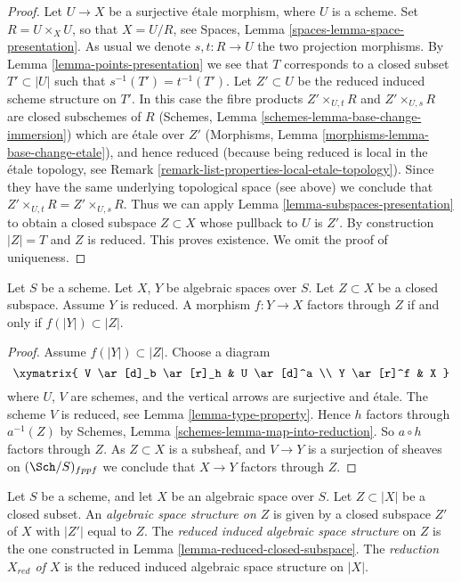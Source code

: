 \begin{proof}
Let $U \to X$ be a surjective \'etale morphism, where $U$ is a scheme.
Set $R = U \times_X U$, so that $X = U/R$, see
Spaces, Lemma \ref{spaces-lemma-space-presentation}.
As usual we denote $s, t : R \to U$ the two projection morphisms.
By Lemma \ref{lemma-points-presentation}
we see that $T$ corresponds to a closed subset $T' \subset |U|$ such
that $s^{-1}(T') = t^{-1}(T')$.
Let $Z' \subset U$ be the reduced induced scheme structure on $T'$.
In this case the fibre products
$Z' \times_{U, t} R$ and $Z' \times_{U, s} R$ are closed subschemes
of $R$
(Schemes, Lemma \ref{schemes-lemma-base-change-immersion})
which are \'etale over $Z'$
(Morphisms, Lemma \ref{morphisms-lemma-base-change-etale}),
and hence reduced
(because being reduced is local in the \'etale topology, see
Remark \ref{remark-list-properties-local-etale-topology}).
Since they have the same underlying topological space (see above)
we conclude that $Z' \times_{U, t} R = Z' \times_{U, s} R$.
Thus we can apply Lemma \ref{lemma-subspaces-presentation}
to obtain a closed subspace $Z \subset X$ whose pullback to $U$ is $Z'$.
By construction $|Z| = T$ and $Z$ is reduced. This proves existence.
We omit the proof of uniqueness.
\end{proof}

\begin{lemma}
\label{lemma-map-into-reduction}
Let $S$ be a scheme.
Let $X$, $Y$ be algebraic spaces over $S$.
Let $Z \subset X$ be a closed subspace.
Assume $Y$ is reduced.
A morphism $f : Y \to X$ factors through $Z$ if and only if
$f(|Y|) \subset |Z|$.
\end{lemma}

\begin{proof}
Assume $f(|Y|) \subset |Z|$. Choose a diagram
$$
\xymatrix{
V \ar[d]_b \ar[r]_h & U \ar[d]^a \\
Y \ar[r]^f & X
}
$$
where $U$, $V$ are schemes, and the vertical arrows are surjective and
\'etale. The scheme $V$ is reduced, see
Lemma \ref{lemma-type-property}.
Hence $h$ factors through $a^{-1}(Z)$ by
Schemes, Lemma \ref{schemes-lemma-map-into-reduction}.
So $a \circ h$ factors through $Z$.
As $Z \subset X$ is a subsheaf, and $V \to Y$ is a surjection of sheaves
on $(\Sch/S)_{fppf}$ we conclude that $X \to Y$ factors
through $Z$.
\end{proof}

\begin{definition}
\label{definition-reduced-induced-space}
Let $S$ be a scheme, and let $X$ be an algebraic space over $S$.
Let $Z \subset |X|$ be a closed subset.
An {\it algebraic space structure on $Z$} is given by a closed subspace
$Z'$ of $X$ with $|Z'|$ equal to $Z$.
The {\it reduced induced algebraic space structure}
on $Z$ is the one constructed in
Lemma \ref{lemma-reduced-closed-subspace}.
The {\it reduction $X_{red}$ of $X$} is the reduced induced algebraic
space structure on $|X|$.
\end{definition}













